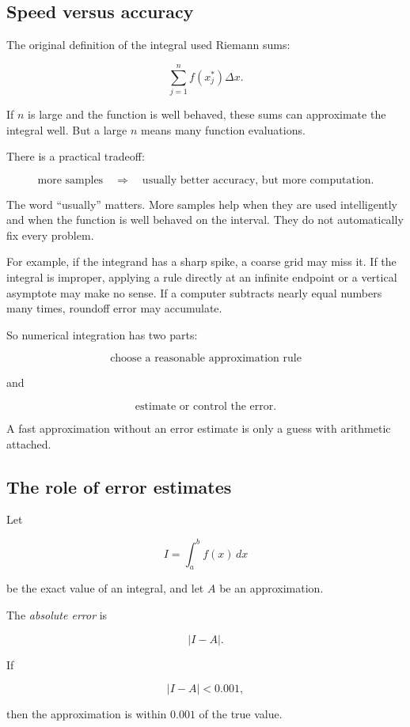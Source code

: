 \subsection{Speed versus accuracy}
\label{subsec:speed-versus-accuracy}

The original definition of the integral used Riemann sums:

\[
\sum_{j=1}^n f(x_j^*)\Delta x.
\]

If \(n\) is large and the function is well behaved, these sums can approximate the
integral well.  But a large \(n\) means many function evaluations.

There is a practical tradeoff:

\[
\text{more samples}
\quad\Longrightarrow\quad
\text{usually better accuracy, but more computation}.
\]

The word ``usually'' matters.  More samples help when they are used intelligently and
when the function is well behaved on the interval.  They do not automatically fix every
problem.

For example, if the integrand has a sharp spike, a coarse grid may miss it.  If the
integral is improper, applying a rule directly at an infinite endpoint or a vertical
asymptote may make no sense.  If a computer subtracts nearly equal numbers many
times, roundoff error may accumulate.

So numerical integration has two parts:

\[
\text{choose a reasonable approximation rule}
\]

and

\[
\text{estimate or control the error}.
\]

A fast approximation without an error estimate is only a guess with arithmetic attached.

\subsection{The role of error estimates}
\label{subsec:role-of-error-estimates}

Let

\[
I=\int_a^b f(x)\,dx
\]

be the exact value of an integral, and let \(A\) be an approximation.

The \emph{absolute error} is

\[
\boxed{
|I-A|.
}
\]

If

\[
|I-A|<0.001,
\]

then the approximation is within \(0.001\) of the true value.


